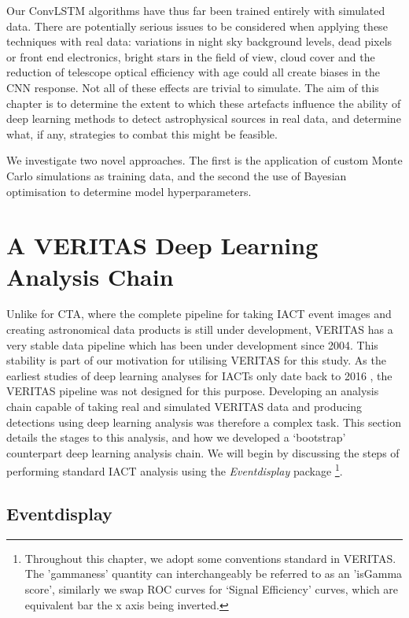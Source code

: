 Our ConvLSTM algorithms have thus far been trained entirely with simulated data. There are potentially serious issues to be considered when applying these techniques with real data: variations in night sky background levels, dead pixels or front end electronics, bright stars in the field of view, cloud cover and the reduction of telescope optical efficiency with age could all create biases in the CNN response. Not all of these effects are trivial to simulate. The aim of this chapter is to determine the extent to which these artefacts influence the ability of deep learning methods to detect astrophysical sources in real data, and determine what, if any, strategies to combat this might be feasible. 

We investigate two novel approaches. The first is the application of custom Monte Carlo simulations as training data, and the second the use of Bayesian optimisation to determine model hyperparameters.

\section{A VERITAS Deep Learning Analysis Chain}
Unlike for CTA, where the complete pipeline for taking IACT event images and creating astronomical data products is still under development, VERITAS has a very stable data pipeline which has been under development since 2004. This stability is part of our motivation for utilising VERITAS for this study. As the earliest studies of deep learning analyses for IACTs only date back to 2016 \cite{feng2016}, the VERITAS pipeline was not designed for this purpose. Developing an analysis chain capable of taking real and simulated VERITAS data and producing detections using deep learning analysis was therefore a complex task. This section details the stages to this analysis, and how we developed a `bootstrap' counterpart deep learning analysis chain. We will begin by discussing the steps of performing standard IACT analysis using the \textit{Eventdisplay} package \footnote{Throughout this chapter, we adopt some conventions standard in VERITAS. The 'gammaness' quantity can interchangeably be referred to as an 'isGamma score', similarly we swap ROC curves for `Signal Efficiency' curves, which are equivalent bar the x axis being inverted.}.

\subsection{Eventdisplay}


